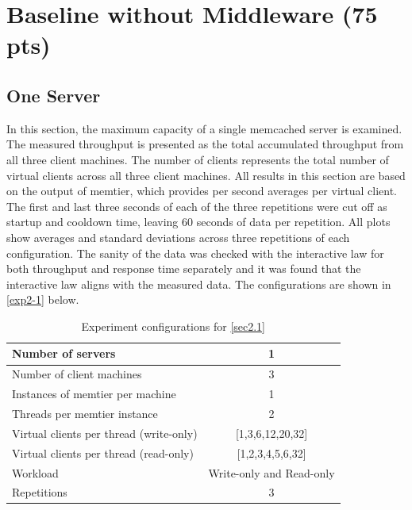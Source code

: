\documentclass[11pt,a4paper]{article}
\begin{document}
\section{Baseline without Middleware (75 pts)} \label{section2}

\subsection{One Server} \label{sec2.1}

In this section, the maximum capacity of a single memcached server is examined. The measured throughput is presented as the total accumulated throughput from all three client machines. The number of clients represents the total number of virtual clients across all three client machines. All results in this section are based on the output of memtier, which provides per second averages per virtual client. The first and last three seconds of each of the three repetitions were cut off as startup and cooldown time, leaving 60 seconds of data per repetition. All plots show averages and standard deviations across three repetitions of each configuration. The sanity of the data was checked with the interactive law for both throughput and response time separately and it was found that the interactive law aligns with the measured data. The configurations are shown in \autoref{exp2-1} below.

\begin{table}
    \centering
	\begin{tabular}{|l|c|}
		\hline Number of servers                        & 1                                 \\ 
		\hline Number of client machines                & 3                                 \\ 
		\hline Instances of memtier per machine         & 1                                 \\ 
		\hline Threads per memtier instance             & 2                                 \\
		\hline Virtual clients per thread (write-only)  & [1,3,6,12,20,32]                  \\ 
		\hline Virtual clients per thread (read-only)   & [1,2,3,4,5,6,32]                  \\ 
		\hline Workload                                 & Write-only and Read-only          \\
		\hline Repetitions                              & 3                                 \\ 
		\hline 
	\end{tabular}
	\caption{Experiment configurations for \autoref{sec2.1}} \label{exp2-1}
\end{table}
\end{document}
